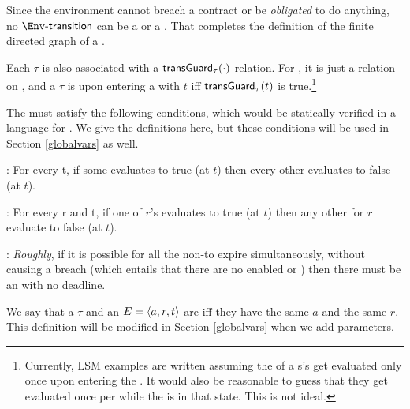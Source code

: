 \documentclass[12pt]{article}
\begin{document}


Since the environment \Env cannot breach a contract or be {\it obligated} to do anything, no $\depTrans{\Env}$ can be a \mustntran or a \rmustntran.
That completes the definition of the finite directed graph \skeleton of a \Contract.

\medskip

Each \transition $\tau$ is also associated with a  $\textsf{transGuard}_{\tau}(\cdot)$ relation. For \FSContracts, it is just a relation on \TimeStamps,
and a \transition $\tau$ is  upon entering a \GlobalState with \TimeStamp $t$ iff $\textsf{transGuard}_{\tau}(t)$ is true.\footnote{Currently, LSM examples are written assuming the \TGuards of a \State s's \transitions get evaluated only once upon entering the \State. It would also be reasonable to guess that they get evaluated once per \TimeUnit while the \Contract is in that state. This is not ideal.}  

The \TGuards must satisfy the following conditions, which would be statically verified in a language for \Contracts. We give the \FSContracts definitions here, but these conditions will be used in Section \ref{globalvars} as well.
\medskip

\noindent {}: For every \TimeStamp t, if some \mustntran evaluates to true (at $t$) then every other \TGuard evaluates to false (at $t$). 
\medskip

\noindent {}: For every \Role r and \TimeStamp t, if one of $r$'s \rmustntrans evaluates to true (at $t$) then any other \rmustntrans for $r$ evaluate to false (at $t$).
\medskip

\noindent {}: {\it Roughly}, if it is possible for all the \enabled non-\Env \transitions to expire simultaneously, without causing a breach (which entails that there are no enabled \mustntrans or \rmustntrans) then there must be an \depTrans{\Env} with no deadline.
\smallskip

We say that a \transition $\tau$ and an \Event $E = \langle a,r,t\rangle$ are  iff they have the same \Action $a$ and the same \Role $r$. This definition will be modified in Section \ref{globalvars} when we add \Event parameters.
\medskip
\end{document}
